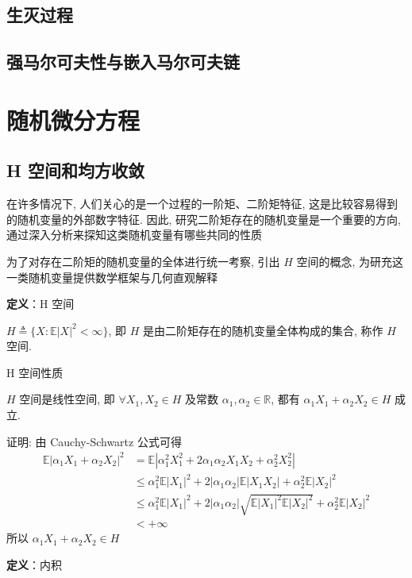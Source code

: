\documentclass[openany]{ctexbook}
\theoremstyle{kaiti}
\theoremstyle{normal}
\begin{document}
\section{生灭过程}

\section{强马尔可夫性与嵌入马尔可夫链}

\chapter{随机微分方程}

\section{H 空间和均方收敛}

在许多情况下, 人们关心的是一个过程的一阶矩、二阶矩特征, 这是比较容易得到的随机变量的外部数字特征. 因此, 研究二阶矩存在的随机变量是一个重要的方向, 通过深入分析来探知这类随机变量有哪些共同的性质

为了对存在二阶矩的随机变量的全体进行统一考察, 引出 $H$ 空间的概念, 为研充这一类随机变量提供数学框架与几何直观解释

\textbf{定义}：H 空间

$H\triangleq\{X:\mathbb{E}|X|^2<\infty\}$, 即 $H$ 是由二阶矩存在的随机变量全体构成的集合, 称作 $H$ 空间.

H 空间性质

$H$ 空间是线性空间, 即 $\forall X_1,X_2\in H$ 及常数 $\alpha_1,\alpha_2\in\mathbb{R}$, 都有 $\alpha_1X_1+\alpha_2X_2\in H$ 成立.

证明: 由 Cauchy-Schwartz 公式可得
\begin{equation}
  \begin{aligned}
    \mathbb{E}|\alpha_1X_1+\alpha_2X_2|^2&=\mathbb{E}|\alpha_1^2X_1^2+2\alpha_1\alpha_2X_1X_2+\alpha_2^2X_2^2|\\
    &\leqslant \alpha_1^2\mathbb{E}|X_1|^2+2|\alpha_1\alpha_2|\mathbb{E}|X_1X_2|+\alpha_2^2\mathbb{E}|X_2|^2\\
    &\leqslant\alpha_1^2\mathbb{E}|X_1|^2+2|\alpha_1\alpha_2|\sqrt{\mathbb{E}|X_1|^2\mathbb{E}|X_2|^2}+\alpha_2^2\mathbb{E}|X_2|^2\\
    &<+\infty
  \end{aligned}
\end{equation} 所以 $\alpha_1X_1+\alpha_2X_2\in H$

\textbf{定义}：内积
\end{document}
